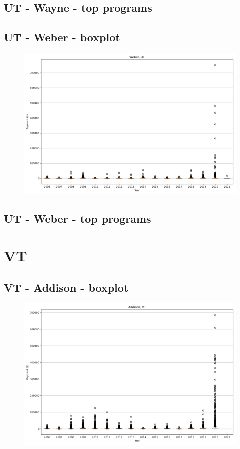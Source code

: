 \subsection*{UT - Wayne - top programs}

\newpage
\subsection*{UT - Weber - boxplot}
\begin{figure}[h]
\centering
\includegraphics[width=7in]{../output/boxplots/counties/Weber-UT_boxplot.png}
\end{figure}


\subsection*{UT - Weber - top programs}

\newpage
\section*{VT}
\subsection*{VT - Addison - boxplot}
\begin{figure}[h]
\centering
\includegraphics[width=7in]{../output/boxplots/counties/Addison-VT_boxplot.png}
\end{figure}


